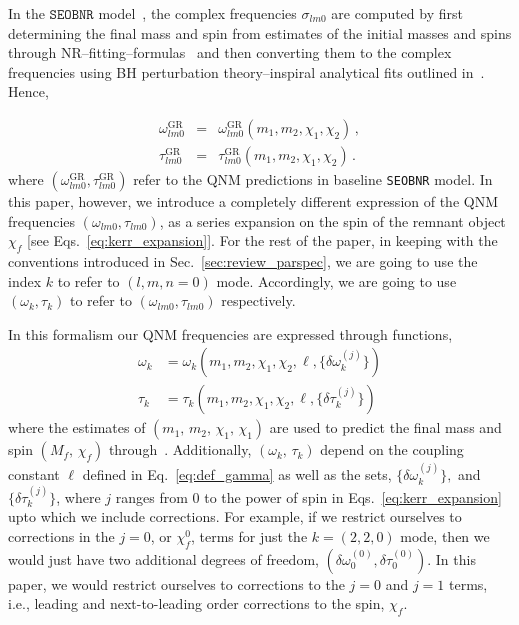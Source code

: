 \documentclass[twocolumn,prd,aps,superscriptaddress,preprintnumbers,tightenlines,showpacs,nofootinbib,eqsecnum,amsfonts,amsmath,longbibliography]{revtex4-1}
\newcommand{\SEOB}{\texttt{SEOBNR}}
\begin{document}
In the $\SEOB$ model~\cite{Mihaylov:2021bpf}, the complex frequencies $\sigma_{l m 0}$ are computed by first determining the final mass and spin from estimates of the initial masses and spins through NR--fitting--formulas~\cite{Taracchini:2013rva,Hofmann:2016yih} and then converting them to the complex frequencies using BH perturbation theory--inspiral analytical fits outlined in~\cite{Berti:2005ys,Berti:2009kk}. Hence,

\begin{subequations}
\begin{eqnarray}
\omega_{l m 0}^{\text{GR}} &=& \omega_{l m 0}^{\text{GR}}(m_1, m_2, \chi_1, \chi_2)\,,\\
\tau _{l m 0}^{\text{GR}} &=& \tau _{l m 0}^{\text{GR}}(m_1, m_2, \chi_1, \chi_2)\,.
\end{eqnarray}
\end{subequations}
where $(\omega_{l m 0}^{\text{GR}}, \tau _{l m 0}^{\text{GR}} )$ refer to the QNM predictions in baseline \SEOB{} model.  In this paper, however, we introduce a completely different expression of the QNM frequencies $(\omega_{l m 0}, \tau _{l m 0})$, as a series expansion on the spin of the remnant object $\chi_f$ [see Eqs.~\eqref{eq:kerr_expansion}].  For the rest of the paper, in keeping with the conventions introduced in Sec.~\ref{sec:review_parspec}, we are going to use the index $k$ to refer to $(l, m,n=0)$ mode. Accordingly, we are going to use $(\omega_k, \tau _k)$ to refer to $(\omega_{l m 0}, \tau _{l m 0})$ respectively.

In this formalism our QNM frequencies are expressed through functions,
%
\begin{subequations}
\begin{align}
\omega_k &= \omega_k(m_1, m_2, \chi_1, \chi_2,\ell, \{\delta \omega_k^{(j)}\})\\
\tau_k   &= \tau _k(m_1, m_2, \chi_1, \chi_2, \ell, \{\delta \tau_k^{(j)}\})
\end{align}
\end{subequations}
%
where the estimates of $(m_1,\, m_2,\, \chi_1,\, \chi_1)$ are used to predict the final mass and spin $(M_f,\, \chi_f)$ through~\cite{Taracchini:2013rva,Hofmann:2016yih}.
%
Additionally, $(\omega_k,\, \tau_k)$ depend on the coupling constant $\ell$ defined in Eq.~\eqref{eq:def_gamma} as well as the sets, $\{\delta \omega_k^{(j)}\},$ and $\{\delta \tau_k^{(j)}\}$, where $j$ ranges from 0 to the power of spin in Eqs.~\ref{eq:kerr_expansion} upto which we include corrections.
%
For example, if we restrict ourselves to corrections in the $j=0$, or $\chi_f^0$, terms for just the $k=(2,2,0)$ mode, then we would just have two additional degrees of freedom, $(\delta \omega_0^{(0)}, \delta \tau_0^{(0)})$. In this paper, we would restrict ourselves to corrections to the $j=0$ and $j=1$ terms, i.e., leading and next-to-leading order corrections to the spin, $\chi_f$.
%
\end{document}
